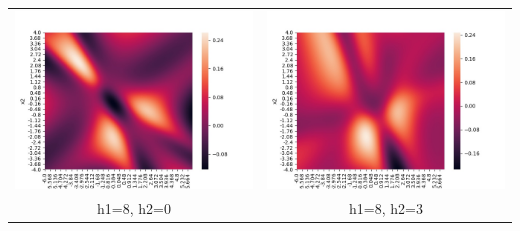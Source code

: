 \documentclass[twoside]{article}
\begin{document}
\begin{tabular}{ cc }
	\includegraphics[scale=0.5]{heatmaps1/B8_0} & \includegraphics[scale=0.5]{heatmaps1/B8_3} \\ 
	h1=8, h2=0 & h1=8, h2=3 \\ 

\end{tabular}
\end{document}

